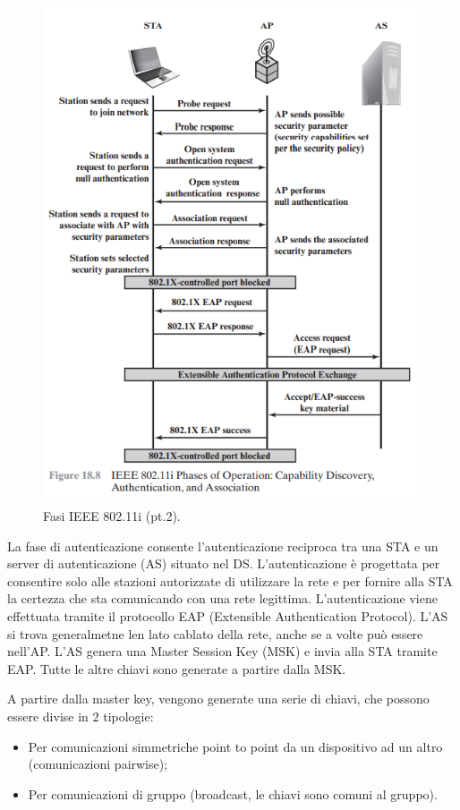 \begin{figure}[h]
    \centering
    \includegraphics[width=1\textwidth]{images/chapter6/6-6.png}
    \caption{Fasi IEEE 802.11i (pt.2).}
    \label{fig:6-4}
\end{figure}

La fase di autenticazione consente l'autenticazione reciproca tra una STA e un server di autenticazione (AS) situato nel DS. L'autenticazione è progettata per consentire solo alle stazioni autorizzate di utilizzare la rete e per fornire alla STA la certezza che sta comunicando con una rete legittima. L'autenticazione viene effettuata tramite il protocollo EAP (Extensible Authentication Protocol).
L'AS si trova generalmetne len lato cablato della rete, anche se a volte può essere nell'AP.
L'AS genera una Master Session Key (MSK) e invia alla STA tramite EAP. Tutte le altre chiavi sono generate a partire dalla MSK.

A partire dalla master key, vengono generate una serie di chiavi, che possono essere divise in 2 tipologie:
\begin{itemize}
    \item Per comunicazioni simmetriche point to point da un dispositivo ad un altro (comunicazioni pairwise);
	\item Per comunicazioni di gruppo (broadcast, le chiavi sono comuni al gruppo).
\end{itemize}

